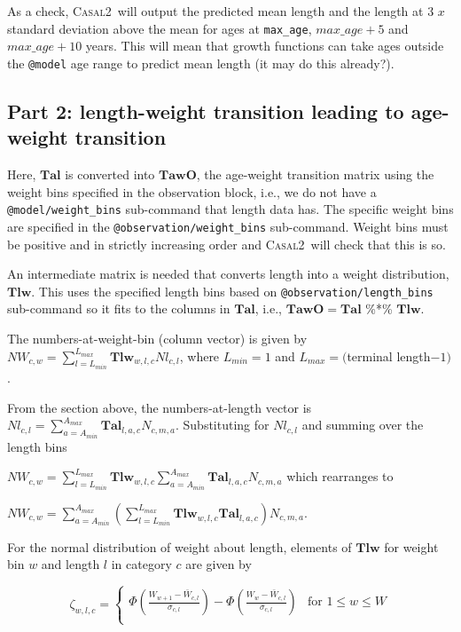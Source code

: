 \documentclass[a4paper,11pt,twoside,pdftex,draft]{article}
\newcommand{\CNAME}{\textsc{Casal2}}
\begin{document}
As a check, \CNAME~will output the predicted mean length and the length at 3 $x$ standard deviation above the mean for ages at  \texttt{max\_age}, $max\_age + 5$ and $max\_age + 10$ years. This will mean that growth functions can take ages outside the \texttt{@model} age range to predict mean length (it may do this already?). 


\subsection{Part 2: length-weight transition leading to age-weight transition}
Here, $\mathbf{Tal}$ is converted into $\mathbf{TawO}$, the age-weight transition matrix  using the weight bins specified in the observation block, i.e., we do not have a
\texttt{@model/weight\_bins} sub-command that length data has. The specific weight bins are specified in the \texttt{@observation/weight\_bins} sub-command.
 Weight bins must be positive and in strictly increasing order and \CNAME~will check that this is so.

An intermediate matrix is needed that converts length into a weight distribution, $\mathbf{Tlw}$. This uses the specified length bins based on \texttt{@observation/length\_bins} sub-command so it fits to the columns in $\mathbf{Tal}$, i.e., $\mathbf{TawO} =\mathbf{Tal} $ \%*\% $ \mathbf{Tlw} $.

The numbers-at-weight-bin (column vector) is given by $NW_{c,w} = \sum_{l=L_{min}}^{L_{max}}  \mathbf{Tlw}_{w,l,c} Nl_{c,l}$, where $L_{min} = 1$ and $L_{max} = ($terminal length$ - 1)$.

From the section above, the numbers-at-length vector is $Nl_{c,l} = \sum_{a=A_{min}}^{A_{max}}  \mathbf{Tal}_{l,a,c} N_{c,m,a}$. Substituting for $Nl_{c,l}$ and summing over the length bins

$NW_{c,w} = \sum_{l=L_{min}}^{L_{max}}  \mathbf{Tlw}_{w,l,c} \sum_{a=A_{min}}^{A_{max}}  \mathbf{Tal}_{l,a,c} N_{c,m,a}$ which rearranges to 

$NW_{c,w} = \sum_{a=A_{min}}^{A_{max}} \left( \sum_{l=L_{min}}^{L_{max}}  \mathbf{Tlw}_{w,l,c}  \mathbf{Tal}_{l,a,c}\right) N_{c,m,a}$. 

For the normal distribution of weight about length, 
elements of $\mathbf{Tlw}$ for weight bin $w$ and length $l$ in category $c$ are given by

\begin{equation}
\zeta_{w,l,c} =
\begin{cases}

\Phi\left( \frac{W_{w+1} - \bar W_{c,l}   }{\sigma_{c,l}} \right)   - \Phi\left( \frac{W_{w} - \bar W_{c,l}   }{\sigma_{c,l}} \right) & \text{for } 1 \leq w \leq W \\

\end{cases}
\end{equation}
\end{document}

